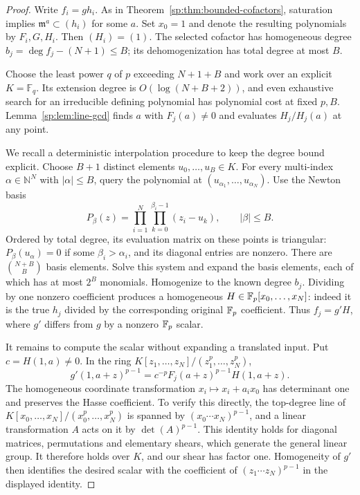 \begin{proof}
Write $f_i=g h_i$. As in
Theorem~\ref{sp:thm:bounded-cofactors}, saturation implies
$\mathfrak m^a\subset(h_i)$ for some $a$. Set $x_0=1$ and denote the
resulting polynomials by $F_i,G,H_i$. Then $(H_i)=(1)$.
The selected cofactor has homogeneous degree
$b_j=\deg f_j-(N+1)\leq B$; its dehomogenization has total degree
at most $B$.

Choose the least power $q$ of $p$ exceeding $N+1+B$ and work over
an explicit $K=\mathbb F_q$. Its extension degree is $O(\log(N+B+2))$,
and even exhaustive search for an irreducible defining polynomial
has polynomial cost at fixed $p,B$. Lemma~\ref{sp:lem:line-gcd}
finds $a$ with $F_j(a)\ne0$ and evaluates $H_j/H_j(a)$ at any point.

We recall a deterministic interpolation procedure to keep the degree
bound explicit. Choose $B+1$ distinct elements
$u_0,\ldots,u_B\in K$. For every multi-index $\alpha\in\mathbb N^N$
with $|\alpha|\leq B$, query the polynomial at
$(u_{\alpha_1},\ldots,u_{\alpha_N})$.
Use the Newton basis
\[
 P_\beta(z)=\prod_{i=1}^N\prod_{k=0}^{\beta_i-1}(z_i-u_k),
 \qquad |\beta|\leq B.
\]
Ordered by total degree, its evaluation matrix on these points is
triangular: $P_\beta(u_\alpha)=0$ if some $\beta_i>\alpha_i$,
and its diagonal entries are nonzero. There are
$\binom{N+B}{B}$ basis elements. Solve this system and expand the
basis elements, each of which has at most $2^B$ monomials.
Homogenize to the known degree $b_j$. Dividing by one nonzero
coefficient produces a homogeneous $H\in\mathbb F_p[x_0,\ldots,x_N]$:
indeed it is the true $h_j$ divided by the corresponding original
$\mathbb F_p$ coefficient. Thus $f_j=g'H$, where $g'$ differs from $g$ by
a nonzero $\mathbb F_p$ scalar.

It remains to compute the scalar without expanding a translated input.
Put $c=H(1,a)\ne0$. In the ring
$K[z_1,\ldots,z_N]/(z_1^p,\ldots,z_N^p)$,
\[
 g'(1,a+z)^{p-1}
   =c^{-p}F_j(a+z)^{p-1}H(1,a+z).
\]
The homogeneous coordinate transformation
$x_i\mapsto x_i+a_i x_0$ has determinant one and preserves the Hasse
coefficient. To verify this directly, the top-degree line of
$K[x_0,\ldots,x_N]/(x_0^p,\ldots,x_N^p)$ is spanned by
$(x_0\cdots x_N)^{p-1}$, and a linear transformation $A$ acts on it
by $\det(A)^{p-1}$. This identity holds for diagonal matrices,
permutations and elementary shears, which generate the general linear
group. It therefore holds over $K$, and our shear has factor one.
Homogeneity of $g'$ then identifies the desired scalar with the
coefficient of $(z_1\cdots z_N)^{p-1}$ in the displayed identity.


\end{proof}
